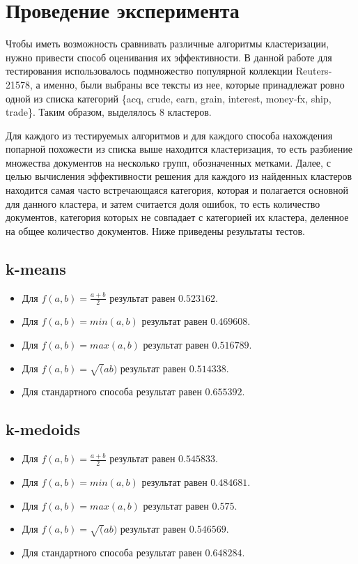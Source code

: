 \section{Проведение эксперимента}
Чтобы иметь возможность сравнивать различные алгоритмы кластеризации, нужно привести способ оценивания их эффективности. В данной работе для тестирования использовалось подмножество популярной коллекции Reuters-21578, а именно, были выбраны все тексты из нее, которые принадлежат ровно одной из списка категорий \{acq, crude, earn, grain, interest, money-fx, ship, trade\}. Таким образом, выделялось 8 кластеров.

Для каждого из тестируемых алгоритмов и для каждого способа нахождения попарной похожести из списка выше находится кластеризация, то есть разбиение множества документов на несколько групп, обозначенных метками. Далее, с целью вычисления эффективности решения для каждого из найденных кластеров находится самая часто встречающаяся категория, которая и полагается основной для данного кластера, и затем считается доля ошибок, то есть количество документов, категория которых не совпадает с категорией их кластера, деленное на общее количество документов. Ниже приведены результаты тестов.

\subsection{k-means}
\begin{itemize}
\item Для $f(a, b) = \frac{a + b}{2}$ результат равен $0.523162$.
\item Для $f(a, b) = min(a, b)$ результат равен $0.469608$.
\item Для $f(a, b) = max(a, b)$ результат равен $0.516789$.
\item Для $f(a, b) = \sqrt(ab)$ результат равен $0.514338$.
\item Для стандартного способа результат равен $0.655392$.
\end{itemize}

\subsection{k-medoids}
\begin{itemize}
\item Для $f(a, b) = \frac{a + b}{2}$ результат равен $0.545833$.
\item Для $f(a, b) = min(a, b)$ результат равен $0.484681$.
\item Для $f(a, b) = max(a, b)$ результат равен $0.575$.
\item Для $f(a, b) = \sqrt(ab)$ результат равен $0.546569$.
\item Для стандартного способа результат равен $0.648284$.
\end{itemize}

